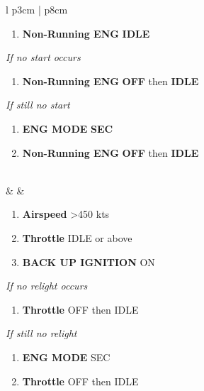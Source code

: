 \documentclass[8pt,usenames,dvipsnames,twoside]{article}
\begin{document}
\begin{center}
\begin{longtable}{l p{3cm} | p{8cm}}
\begin{minipage}[t]{\linewidth}
\begin{enumerate}
					\item \textbf{Non-Running ENG} \dotfill \textbf{IDLE}
				\end{enumerate}
				\vspace{-7pt}
				\emph{If no start occurs}
				\begin{enumerate}[label=(\alph*), resume]
					\vspace{-7pt}
					\item \textbf{Non-Running ENG} \dotfill \textbf{OFF} then \textbf{IDLE}
				\end{enumerate}
				\vspace{-7pt}
				\emph{If still no start}
				\begin{enumerate}[label=(\alph*), resume]
					\vspace{-7pt}
					\item \textbf{ENG MODE} \dotfill \textbf{SEC}
					\item \textbf{Non-Running ENG} \dotfill \textbf{OFF} then \textbf{IDLE}
				\end{enumerate}
			\end{minipage} \\
			\midrule
			\textbullet &  &
			\begin{minipage}[t]{\linewidth}
				\vspace{-7pt}
				\begin{enumerate}
					\item \textbf{Airspeed} \dotfill >450 kts
					\item \textbf{Throttle} \dotfill IDLE or above
					\item \textbf{BACK UP IGNITION} \dotfill ON
				\end{enumerate}
				\vspace{-7pt}
				\emph{If no relight occurs}
				\begin{enumerate}[label=(\alph*), resume]
					\vspace{-7pt}
					\item \textbf{Throttle} \dotfill OFF then IDLE
				\end{enumerate}
				\vspace{-7pt}
				\emph{If still no relight}
				\begin{enumerate}[label=(\alph*), resume]
					\vspace{-7pt}
					\item \textbf{ENG MODE} \dotfill SEC
					\item \textbf{Throttle} \dotfill OFF then IDLE
				\end{enumerate}

\end{minipage}
\end{longtable}
\end{center}
\end{document}
